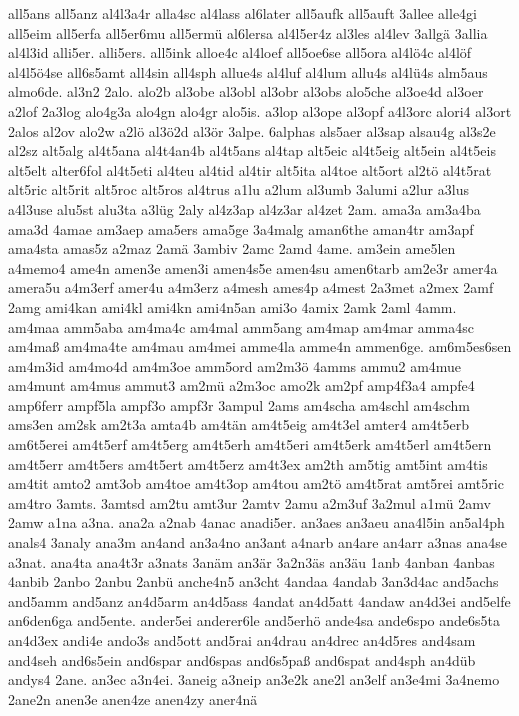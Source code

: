 {all5ans
all5anz
al4l3a4r
alla4sc
al4lass
al6later
all5aufk
all5auft
3allee
alle4gi
all5eim
all5erfa
all5er6mu
all5ermü
al6lersa
al4l5er4z
al3les
al4lev
3allgä
3allia
al4l3id
alli5er.
alli5ers.
all5ink
alloe4c
al4loef
all5oe6se
all5ora
al4lö4c
al4löf
al4l5ö4se
all6s5amt
all4sin
all4sph
allue4s
al4luf
al4lum
allu4s
al4lü4s
alm5aus
almo6de.
al3n2
2alo.
alo2b
al3obe
al3obl
al3obr
al3obs
alo5che
al3oe4d
al3oer
a2lof
2a3log
alo4g3a
alo4gn
alo4gr
alo5is.
a3lop
al3ope
al3opf
a4l3orc
alori4
al3ort
2alos
al2ov
alo2w
a2lö
al3ö2d
al3ör
3alpe.
6alphas
als5aer
al3sap
alsau4g
al3s2e
al2sz
alt5alg
al4t5ana
al4t4an4b
al4t5ans
al4tap
alt5eic
al4t5eig
alt5ein
al4t5eis
alt5elt
alter6fol
al4t5eti
al4teu
al4tid
al4tir
alt5ita
al4toe
alt5ort
al2tö
al4t5rat
alt5ric
alt5rit
alt5roc
alt5ros
al4trus
a1lu
a2lum
al3umb
3alumi
a2lur
a3lus
a4l3use
alu5st
alu3ta
a3lüg
2aly
al4z3ap
al4z3ar
al4zet
2am.
ama3a
am3a4ba
ama3d
4amae
am3aep
ama5ers
ama5ge
3a4malg
aman6the
aman4tr
am3apf
ama4sta
amas5z
a2maz
2amä
3ambiv
2amc
2amd
4ame.
am3ein
ame5len
a4memo4
ame4n
amen3e
amen3i
amen4s5e
amen4su
amen6tarb
am2e3r
amer4a
amera5u
a4m3erf
amer4u
a4m3erz
a4mesh
ames4p
a4mest
2a3met
a2mex
2amf
2amg
ami4kan
ami4kl
ami4kn
ami4n5an
ami3o
4amix
2amk
2aml
4amm.
am4maa
amm5aba
am4ma4c
am4mal
amm5ang
am4map
am4mar
amma4sc
am4maß
am4ma4te
am4mau
am4mei
amme4la
amme4n
ammen6ge.
am6m5es6sen
am4m3id
am4mo4d
am4m3oe
amm5ord
am2m3ö
4amms
ammu2
am4mue
am4munt
am4mus
ammut3
am2mü
a2m3oc
amo2k
am2pf
amp4f3a4
ampfe4
amp6ferr
ampf5la
ampf3o
ampf3r
3ampul
2ams
am4scha
am4schl
am4schm
ams3en
am2sk
am2t3a
amta4b
am4tän
am4t5eig
am4t3el
amter4
am4t5erb
am6t5erei
am4t5erf
am4t5erg
am4t5erh
am4t5eri
am4t5erk
am4t5erl
am4t5ern
am4t5err
am4t5ers
am4t5ert
am4t5erz
am4t3ex
am2th
am5tig
amt5int
am4tis
am4tit
amto2
amt3ob
am4toe
am4t3op
am4tou
am2tö
am4t5rat
amt5rei
amt5ric
am4tro
3amts.
3amtsd
am2tu
amt3ur
2amtv
2amu
a2m3uf
3a2mul
a1mü
2amv
2amw
a1na
a3na.
ana2a
a2nab
4anac
anadi5er.
an3aes
an3aeu
ana4l5in
an5al4ph
anals4
3analy
ana3m
an4and
an3a4no
an3ant
a4narb
an4are
an4arr
a3nas
ana4se
a3nat.
ana4ta
ana4t3r
a3nats
3anäm
an3är
3a2n3äs
an3äu
1anb
4anban
4anbas
4anbib
2anbo
2anbu
2anbü
anche4n5
an3cht
4andaa
4andab
3an3d4ac
and5achs
and5amm
and5anz
an4d5arm
an4d5ass
4andat
an4d5att
4andaw
an4d3ei
and5elfe
an6den6ga
and5ente.
ander5ei
anderer6le
and5erhö
ande4sa
ande6spo
ande6s5ta
an4d3ex
andi4e
ando3s
and5ott
and5rai
an4drau
an4drec
an4d5res
and4sam
and4seh
and6s5ein
and6spar
and6spas
and6s5paß
and6spat
and4sph
an4düb
andys4
2ane.
an3ec
a3n4ei.
3aneig
a3neip
an3e2k
ane2l
an3elf
an3e4mi
3a4nemo
2ane2n
anen3e
anen4ze
anen4zy
aner4nä
}
